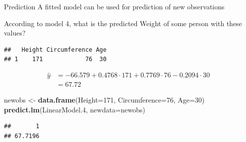 \documentclass[
  ignorenonframetext,
]{beamer}
\newenvironment{Shaded}{\begin{snugshade}}{\end{snugshade}}
\newcommand{\AttributeTok}[1]{\textcolor[rgb]{0.13,0.29,0.53}{#1}}
\newcommand{\DecValTok}[1]{\textcolor[rgb]{0.00,0.00,0.81}{#1}}
\newcommand{\FloatTok}[1]{\textcolor[rgb]{0.00,0.00,0.81}{#1}}
\newcommand{\FunctionTok}[1]{\textcolor[rgb]{0.13,0.29,0.53}{\textbf{#1}}}
\newcommand{\NormalTok}[1]{#1}
\newcommand{\OtherTok}[1]{\textcolor[rgb]{0.56,0.35,0.01}{#1}}
\newcommand{\StringTok}[1]{\textcolor[rgb]{0.31,0.60,0.02}{#1}}
\begin{document}
\begin{frame}[fragile]{Prediction}
\label{prediction}
A fitted model can be used for prediction of new observations

According to model 4, what is the predicted Weight of some person with
these values?

\begin{verbatim}
##   Height Circumference Age
## 1    171            76  30
\end{verbatim}

\[
\begin{split}
\widehat{y} &= -66.579 + 0.4768\cdot171 + 0.7769\cdot76 - 0.2094\cdot30 \\
& = 67.72
\end{split}
\]

\begin{Shaded}
\begin{Highlighting}[]
\NormalTok{newobs }\OtherTok{\textless{}{-}} \FunctionTok{data.frame}\NormalTok{(}\StringTok{\textquotesingle{}Height\textquotesingle{}}\OtherTok{=}\DecValTok{171}\NormalTok{, }\StringTok{\textquotesingle{}Circumference\textquotesingle{}}\OtherTok{=}\DecValTok{76}\NormalTok{, }\StringTok{\textquotesingle{}Age\textquotesingle{}}\OtherTok{=}\DecValTok{30}\NormalTok{)}
\FunctionTok{predict.lm}\NormalTok{(LinearModel}\FloatTok{.4}\NormalTok{, }\AttributeTok{newdata=}\NormalTok{newobs)}
\end{Highlighting}
\end{Shaded}

\begin{verbatim}
##       1 
## 67.7196
\end{verbatim}
\end{frame}
\end{document}
